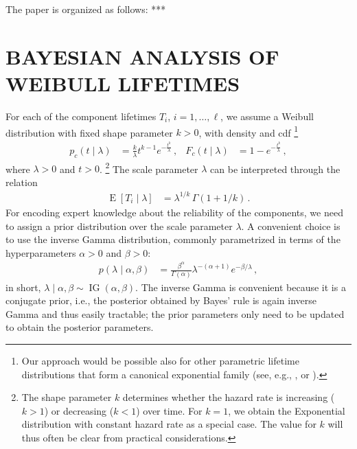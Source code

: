 \documentclass[12pt,a4paper,twocolumn,fleqn]{narms}
\newcommand{\E}{\operatorname{E}}
\newcommand{\ig}{\operatorname{IG}}   %
\begin{document}
The paper is organized as follows: *** 


\section{BAYESIAN ANALYSIS OF WEIBULL LIFETIMES}
\label{sec:weibull}

For each of the component lifetimes $T_i$, $i=1,\ldots,\ell$,
we assume a Weibull distribution with fixed shape parameter $k > 0$, with density and cdf%
\footnote{Our approach would be possible also for other parametric lifetime distributions
that form a canonical exponential family
(see, e.g., , or ).}
\begin{align}
p_c(t \mid \lambda) &= \frac{k}{\lambda} t^{k-1} e^{-\frac{t^k}{\lambda}}\,, 
&
F_c(t \mid \lambda) &= 1 - e^{-\frac{t^k}{\lambda}} \,,
\label{eq:weibull-pdf-cdf}
\end{align}
where $\lambda > 0$ and $t > 0$.%
\footnote{The shape parameter $k$ determines whether the hazard rate is increasing ($k > 1$)
or decreasing ($k < 1$) over time.
For $k=1$, we obtain the Exponential distribution with constant hazard rate as a special case.
The value for $k$ will thus often be clear from practical considerations.}
The scale parameter $\lambda$ can be interpreted through the relation
\begin{align}
\E[T_i \mid \lambda] &= \lambda^{1/k}\, \Gamma(1 + 1/k)\,.
\label{eq:lambdainterpret}
\end{align}
For encoding expert knowledge about the reliability of the components,
we need to assign a prior distribution over the scale parameter $\lambda$.
A convenient choice is to use the inverse Gamma distribution,
commonly parametrized in terms of the hyperparameters $\alpha > 0$ and $\beta > 0$:
\begin{align}
p(\lambda \mid \alpha, \beta) &= \frac{\beta^\alpha}{\Gamma(\alpha)} \lambda^{-(\alpha + 1)} e^{-\beta/\lambda} \,,
\end{align}
in short, $\lambda \mid \alpha, \beta \sim \ig(\alpha, \beta)$.
The inverse Gamma is convenient because it is a conjugate prior,
i.e., the posterior obtained by Bayes' rule is again inverse Gamma and thus easily tractable;
the prior parameters only need to be updated to obtain the posterior parameters.
\end{document}
